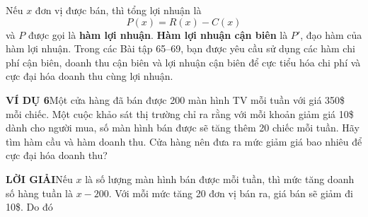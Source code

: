 \documentclass[10pt]{article}
\begin{document}
Nếu $x$ đơn vị được bán, thì tổng lợi nhuận là
\[
P(x) = R(x) - C(x)
\]
và $P$ được gọi là \textbf{hàm lợi nhuận}. \textbf{Hàm lợi nhuận cận biên} là $P'$, đạo hàm của hàm lợi nhuận. Trong các Bài tập 65--69, bạn được yêu cầu sử dụng các hàm chi phí cận biên, doanh thu cận biên và lợi nhuận cận biên để cực tiểu hóa chi phí và cực đại hóa doanh thu cùng lợi nhuận.

\vspace{1.2em}
\noindent
\textbf{\textcolor{stewartblue}{\textsf{VÍ DỤ 6}}}\quad Một cửa hàng đã bán được 200 màn hình TV mỗi tuần với giá 350\$ mỗi chiếc. Một cuộc khảo sát thị trường chỉ ra rằng với mỗi khoản giảm giá 10\$ dành cho người mua, số màn hình bán được sẽ tăng thêm 20 chiếc mỗi tuần. Hãy tìm hàm cầu và hàm doanh thu. Cửa hàng nên đưa ra mức giảm giá bao nhiêu để cực đại hóa doanh thu?

\vspace{0.6em}
\noindent
\textbf{\textcolor{stewartblue}{\textsf{LỜI GIẢI}}}\quad Nếu $x$ là số lượng màn hình bán được mỗi tuần, thì mức tăng doanh số hàng tuần là $x - 200$. Với mỗi mức tăng 20 đơn vị bán ra, giá bán sẽ giảm đi 10\$. Do đó
\end{document}
